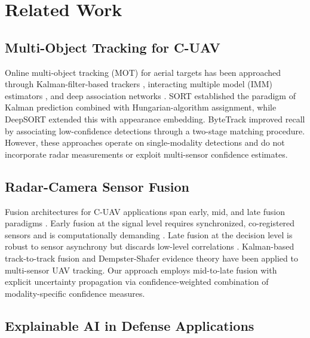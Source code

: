 \documentclass[drones,article,submit,pdftex]{Definitions/mdpi}
\begin{document}
\section{Related Work}
\label{sec:related}

\subsection{Multi-Object Tracking for C-UAV}

Online multi-object tracking (MOT) for aerial targets has been approached through
Kalman-filter-based trackers \cite{ref_sort,ref_deepsort}, interacting multiple
model (IMM) estimators \cite{ref_imm_tracking}, and deep association networks
\cite{ref_bytetrack,ref_strongsort}.
SORT \cite{ref_sort} established the paradigm of Kalman prediction combined with
Hungarian-algorithm assignment, while DeepSORT \cite{ref_deepsort} extended this
with appearance embedding.
ByteTrack \cite{ref_bytetrack} improved recall by associating low-confidence
detections through a two-stage matching procedure.
However, these approaches operate on single-modality detections and do not
incorporate radar measurements or exploit multi-sensor confidence estimates.

\subsection{Radar-Camera Sensor Fusion}

Fusion architectures for C-UAV applications span early, mid, and late
fusion paradigms \cite{ref_radar_camera_fusion}.
Early fusion at the signal level requires synchronized, co-registered sensors
and is computationally demanding \cite{ref_early_fusion}.
Late fusion at the decision level is robust to sensor asynchrony but discards
low-level correlations \cite{ref_late_fusion}.
Kalman-based track-to-track fusion \cite{ref_t2t_fusion} and
Dempster-Shafer evidence theory \cite{ref_dempster_shafer} have been applied
to multi-sensor UAV tracking.
Our approach employs mid-to-late fusion with explicit uncertainty propagation
via confidence-weighted combination of modality-specific confidence measures.

\subsection{Explainable AI in Defense Applications}
\end{document}
